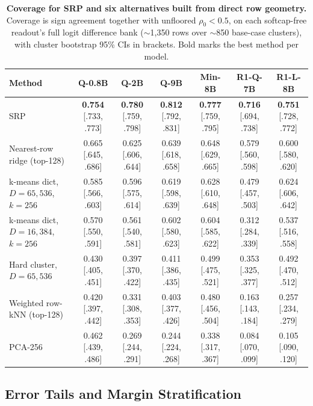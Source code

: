 \begin{table}[!tbp]
\caption{\textbf{Coverage for SRP and six
alternatives built from direct row geometry.} Coverage is sign agreement together with unfloored
\(\rho_0<0.5\), on each softcap-free readout's full logit difference bank
(\(\sim\)1{,}350 rows over \(\sim\)850 base-case clusters), with cluster
bootstrap 95\% CIs in brackets. Bold marks the best method per model.}
\label{tab:app-direct-geometry-grid}
\centering
\scriptsize
\setlength{\tabcolsep}{3pt}
\renewcommand{\arraystretch}{1.08}
\begin{tabularx}{\textwidth}{@{}>{\RaggedRight\arraybackslash}Xcccccc@{}}
\toprule
Method & Q-0.8B & Q-2B & Q-9B & Min-8B & R1-Q-7B & R1-L-8B \\
\midrule
SRP & \textbf{0.754} [.733, .773] & \textbf{0.780} [.759, .798] & \textbf{0.812} [.792, .831] & \textbf{0.777} [.759, .795] & \textbf{0.716} [.694, .738] & \textbf{0.751} [.728, .772] \\
Nearest-row ridge (top-128) & 0.665 [.645, .686] & 0.625 [.606, .644] & 0.639 [.618, .658] & 0.648 [.629, .665] & 0.579 [.560, .598] & 0.600 [.580, .620] \\
k-means dict, \(D{=}65{,}536\), \(k{=}256\) & 0.585 [.566, .603] & 0.596 [.575, .614] & 0.619 [.598, .639] & 0.628 [.610, .648] & 0.479 [.457, .503] & 0.624 [.606, .642] \\
k-means dict, \(D{=}16{,}384\), \(k{=}256\) & 0.570 [.550, .591] & 0.561 [.540, .581] & 0.602 [.580, .623] & 0.604 [.585, .622] & 0.312 [.284, .339] & 0.537 [.516, .558] \\
Hard cluster, \(D{=}65{,}536\) & 0.430 [.405, .451] & 0.397 [.370, .422] & 0.411 [.386, .435] & 0.499 [.475, .521] & 0.353 [.325, .377] & 0.492 [.470, .512] \\
Weighted row-kNN (top-128) & 0.420 [.397, .442] & 0.331 [.308, .353] & 0.403 [.377, .426] & 0.480 [.456, .504] & 0.163 [.143, .184] & 0.257 [.234, .279] \\
PCA-256 & 0.462 [.439, .486] & 0.269 [.244, .291] & 0.244 [.224, .268] & 0.338 [.317, .367] & 0.084 [.070, .099] & 0.105 [.090, .120] \\
\bottomrule
\end{tabularx}
\end{table}

\subsection{Error Tails and Margin Stratification}
\label{app:error-tails}

